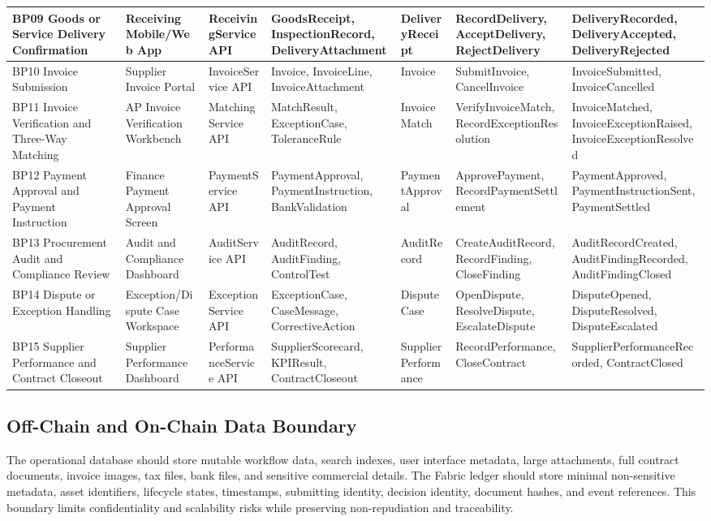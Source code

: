 \documentclass[conference]{IEEEtran}
\begin{document}
\begin{table}[t]
\begin{tabularx}{\textwidth}{|L{2.2cm}|L{2.1cm}|L{2.1cm}|Y|L{1.6cm}|L{2.3cm}|L{2.3cm}|}
BP09 Goods or Service Delivery Confirmation & Receiving Mobile/Web App & ReceivingService API & GoodsReceipt, InspectionRecord, DeliveryAttachment & DeliveryReceipt & RecordDelivery, AcceptDelivery, RejectDelivery & DeliveryRecorded, DeliveryAccepted, DeliveryRejected \\ \hline
BP10 Invoice Submission & Supplier Invoice Portal & InvoiceService API & Invoice, InvoiceLine, InvoiceAttachment & Invoice & SubmitInvoice, CancelInvoice & InvoiceSubmitted, InvoiceCancelled \\ \hline
BP11 Invoice Verification and Three-Way Matching & AP Invoice Verification Workbench & MatchingService API & MatchResult, ExceptionCase, ToleranceRule & InvoiceMatch & VerifyInvoiceMatch, RecordExceptionResolution & InvoiceMatched, InvoiceExceptionRaised, InvoiceExceptionResolved \\ \hline
BP12 Payment Approval and Payment Instruction & Finance Payment Approval Screen & PaymentService API & PaymentApproval, PaymentInstruction, BankValidation & PaymentApproval & ApprovePayment, RecordPaymentSettlement & PaymentApproved, PaymentInstructionSent, PaymentSettled \\ \hline
BP13 Procurement Audit and Compliance Review & Audit and Compliance Dashboard & AuditService API & AuditRecord, AuditFinding, ControlTest & AuditRecord & CreateAuditRecord, RecordFinding, CloseFinding & AuditRecordCreated, AuditFindingRecorded, AuditFindingClosed \\ \hline
BP14 Dispute or Exception Handling & Exception/Dispute Case Workspace & ExceptionService API & ExceptionCase, CaseMessage, CorrectiveAction & DisputeCase & OpenDispute, ResolveDispute, EscalateDispute & DisputeOpened, DisputeResolved, DisputeEscalated \\ \hline
BP15 Supplier Performance and Contract Closeout & Supplier Performance Dashboard & PerformanceService API & SupplierScorecard, KPIResult, ContractCloseout & SupplierPerformance & RecordPerformance, CloseContract & SupplierPerformanceRecorded, ContractClosed \\ \hline
\end{tabularx}
\end{table}

\subsection{Off-Chain and On-Chain Data Boundary}
The operational database should store mutable workflow data, search indexes, user interface metadata, large attachments, full contract documents, invoice images, tax files, bank files, and sensitive commercial details. The Fabric ledger should store minimal non-sensitive metadata, asset identifiers, lifecycle states, timestamps, submitting identity, decision identity, document hashes, and event references. This boundary limits confidentiality and scalability risks while preserving non-repudiation and traceability.
\end{document}

